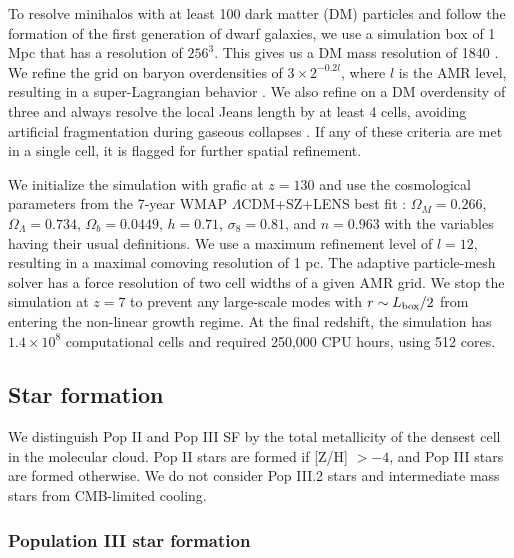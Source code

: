 \documentclass[12pt,preprint]{aastex}
\begin{document}
To resolve minihalos with at least 100 dark matter (DM) particles and
follow the formation of the first generation of dwarf galaxies, we use
a simulation box of 1 Mpc that has a resolution of $256^3$.  This
gives us a DM mass resolution of 1840 \Ms.  We refine the grid on
baryon overdensities of $3 \times 2^{-0.2l}$, where $l$ is the AMR
level, resulting in a super-Lagrangian behavior \citep[also
  see][]{OShea08}.  We also refine on a DM overdensity of three and
always resolve the local Jeans length by at least 4 cells, avoiding
artificial fragmentation during gaseous collapses \citep{Truelove97}.
If any of these criteria are met in a single cell, it is flagged for
further spatial refinement.

We initialize the simulation with grafic \citep{Bertschinger01} at $z
= 130$ and use the cosmological parameters from the 7-year WMAP
$\Lambda$CDM+SZ+LENS best fit \citep{WMAP7}: $\Omega_M = 0.266$,
$\Omega_\Lambda = 0.734$, $\Omega_b = 0.0449$, $h = 0.71$, $\sigma_8 =
0.81$, and $n = 0.963$ with the variables having their usual
definitions.  We use a maximum refinement level of $l = 12$, resulting
in a maximal comoving resolution of 1 pc.  The adaptive particle-mesh
solver has a force resolution of two cell widths of a given AMR grid.
We stop the simulation at $z=7$ to prevent any large-scale modes with
$r \sim L_{\rm box}/2$ from entering the non-linear growth regime.  At
the final redshift, the simulation has $1.4 \times 10^8$ computational
cells and required 250,000 CPU hours, using 512 cores.

\subsection{Star formation}

We distinguish Pop II and Pop III SF by the total metallicity of the
densest cell in the molecular cloud.  Pop II stars are formed if [Z/H]
$> -4$, and Pop III stars are formed otherwise.  We do not consider
Pop III.2 stars and intermediate mass stars from CMB-limited cooling.

\subsubsection{Population III star formation}
\end{document}
